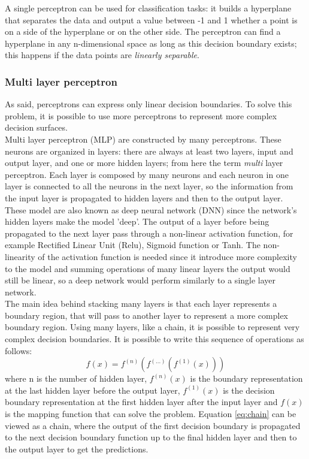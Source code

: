 A single perceptron can be used for classification tasks: it builds a hyperplane that separates the data and output a value between -1 and 1 whether a point is on a side of the hyperplane or on the other side. The perceptron can find a hyperplane in any n-dimensional space as long as this decision boundary exists; this happens if the data points are \emph{linearly separable}.

\subsubsection{Multi layer perceptron}
As said, perceptrons can express only linear decision boundaries. To solve this problem, it is possible to use more perceptrons to represent more complex decision surfaces. \\
Multi layer perceptron (\gls{MLP}) are constructed by many perceptrons. These neurons are organized in layers: there are always at least two layers, input and output layer, and one or more hidden layers; from here the term \emph{multi} layer perceptron. Each layer is composed by many neurons and each neuron in one layer is connected to all the neurons in the next layer, so the information from the input layer is propagated to hidden layers and then to the output layer. These model are also known as deep neural network (\gls{DNN}) since the  network's hidden layers make the model 'deep'. The output of a layer before being propagated to the next layer pass through a non-linear activation function, for example Rectified Linear Unit (\gls{Relu}), Sigmoid function or \gls{Tanh}. The non-linearity of the activation function is needed since it introduce more complexity to the model and summing operations of many linear layers the output would still be linear, so a deep network would perform similarly to a single layer network.\\

The main idea behind stacking many layers is that each layer represents a boundary region, that will pass to another layer to represent a more complex boundary region. Using many layers, like a chain, it is possible to represent very complex decision boundaries. It is possible to write this sequence of operations as follows:
\begin{equation}\label{eq:chain}
f(x) = f^{(n)}( f^{(...)}( f^{(1)}(x)) )
\end{equation}
\noindent where n is the number of hidden layer, $f^{(n)}(x)$ is the boundary representation at the last hidden layer before the output layer, $f^{(1)}(x)$ is the decision boundary representation at the first hidden layer after the input layer and $f(x)$ is the mapping function that can solve the problem. Equation \ref{eq:chain} can be viewed as a chain, where the output of the first decision boundary is propagated to the next decision boundary function up to the final hidden layer and then to the output layer to get the predictions.

